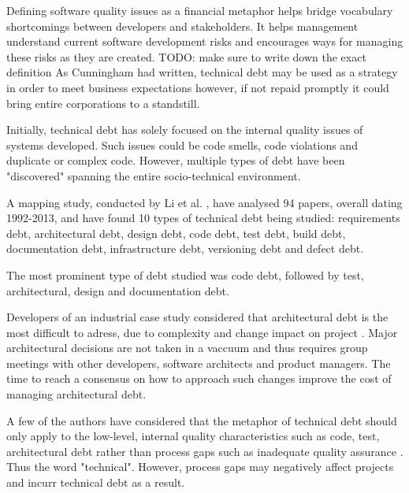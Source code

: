 \documentclass{mprop}
\begin{document}
Defining software quality issues as a financial metaphor helps bridge vocabulary
shortcomings between developers and stakeholders. It helps management understand
current software development risks and encourages ways for managing these risks
as they are created. TODO: make sure to write down the exact definition As
Cunningham \cite{Cunningham1993} had written, technical debt may be used as a
strategy in order to meet business expectations however, if not repaid promptly
it could bring entire corporations to a standstill.

Initially, technical debt has solely focused on the internal quality issues of
systems developed. Such issues could be code smells, code violations and
duplicate or complex code. However, multiple types of debt have been
"discovered" spanning the entire socio-technical environment.

A mapping study, conducted by Li et al. \cite{Li2015}, have analysed 94 papers,
overall dating 1992-2013, and have found 10 types of technical debt being
studied: requirements debt, architectural debt, design debt, code debt, test
debt, build debt, documentation debt, infrastructure debt, versioning debt and
defect debt.

The most prominent type of debt studied was code debt, followed by test,
architectural, design and documentation debt.

Developers of an industrial case study considered that architectural debt is the
most difficult to adress, due to complexity and change impact on project
\cite{Codabux2013}. Major architectural decisions are not taken in a vaccuum and
thus requires group meetings with other developers, software architects and
product managers. The time to reach a consensus on how to approach such changes
improve the cost of managing architectural debt.

A few of the authors have considered that the metaphor of technical debt should
only apply to the low-level, internal quality characteristics such as code,
test, architectural debt rather than process gaps such as inadequate quality
assurance \cite{Theodoropoulos2011} \cite{Nugroho2011}. Thus the word
"technical". However, process gaps may negatively affect projects and incurr
technical debt as a result.

\end{document}
